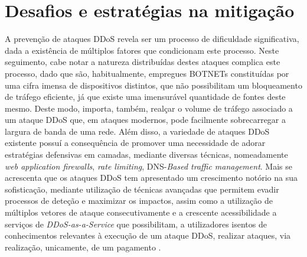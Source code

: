\section{Desafios e estratégias na mitigação}
A prevenção de ataques DDoS revela ser um processo de dificuldade significativa, dada a existência de múltiplos fatores que condicionam este processo. Neste seguimento, cabe notar a natureza distribuídas destes ataques complica este processo, dado que são, habitualmente, empregues BOTNETs constituídas por uma cifra imensa de dispositivos distintos, que não possibilitam um bloqueamento de tráfego eficiente, já que existe uma imensurável quantidade de fontes deste mesmo. Deste modo, importa, também, realçar o volume de tráfego associado a um ataque DDoS que, em ataques modernos, pode facilmente sobrecarregar a largura de banda de uma rede. Além disso, a variedade de ataques DDoS existente possuí a consequência de promover uma necessidade de adorar estratégias defensivas em camadas, mediante diversas técnicas, nomeadamente \textit{web application firewalls}, \textit{rate limiting}, DNS-\textit{Based traffic management}. Mais se acrescenta que os ataques DDoS tem apresentado um crescimento notório na sua sofisticação, mediante utilização de técnicas avançadas que permitem evadir processos de deteção e maximizar os impactos, assim como a utilização de múltiplos vetores de ataque consecutivamente e a crescente acessibilidade a serviços de \textit{DDoS-as-a-Service} que possibilitam, a utilizadores isentos de conhecimentos relevantes à execução de um ataque DDoS, realizar ataques, via realização, unicamente, de um pagamento \cite{perimeter81_ddos_motivations,radware_ddos_prevention,redhelix_rise_ddos_attacks}.

